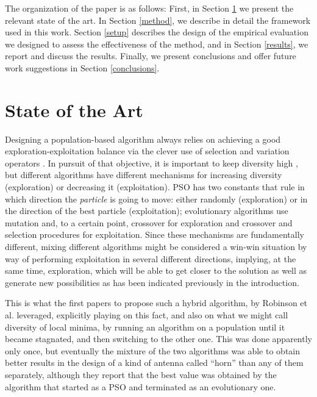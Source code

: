 \documentclass[runningheads]{llncs}
\begin{document}
The organization of the paper is as follows: First, in Section \ref{soa} we present
the relevant state of the art. In Section \ref{method}, we describe in detail the
framework used in this work.  Section \ref{setup} describes the design of the empirical
evaluation we designed to assess the effectiveness of the method, and in Section
\ref{results}, we report and discuss the results. Finally, we present 
conclusions and offer future work suggestions in Section
\ref{conclusions}.

\section{State of the Art}
\label{soa}

Designing a population-based algorithm always relies on achieving a
good exploration-exploitation balance via the clever use of selection
and variation operators \cite{vcrepinvsek2013exploration}. In pursuit
of that objective, it is important to keep diversity high
\cite{yuan2005importance}, but different algorithms have different
mechanisms for increasing diversity (exploration) or decreasing it
(exploitation). PSO has two constants that rule in which direction the
{\em particle} is going to move: either randomly (exploration) or in
the direction of the best particle (exploitation); evolutionary
algorithms use mutation and, to a certain point, crossover for
exploration and crossover and selection procedures for
exploitation. Since these mechanisms are fundamentally different,
mixing different algorithms might be considered a win-win situation by
way of performing exploitation in several different directions,
implying, at the same time, exploration, which will be able to get
closer to the solution as well as generate new possibilities as has
been indicated previously in the introduction.

This is what the first papers to propose such a hybrid algorithm, by
Robinson et al. \cite{Robinson2002} leveraged, explicitly playing on this
fact, and also on what we might call diversity of local minima, by
running an algorithm on a population until it became stagnated, and
then switching to the other one. This was done apparently only once,
but eventually the mixture of the two algorithms was able to obtain
better results in the design of a kind of antenna called ``horn'' than
any of them separately, although they report that the best value
was obtained by the algorithm that started as a PSO and terminated as
an evolutionary one.
\end{document}
